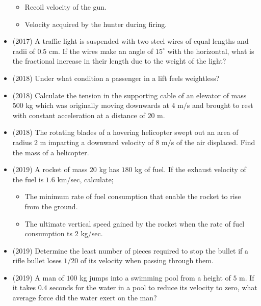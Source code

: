 \documentclass{article}
\begin{document}
\begin{itemize}
 \begin{itemize}
\item Recoil velocity of the gun. 
\item Velocity acquired by the hunter during firing.
\end{itemize}
\item (2017)  A traffic light is suspended with two steel wires of equal lengths and radii of $ 0.5$ cm. If the wires make an angle of $ 15^{\circ}$ with the horizontal, what is the fractional increase in their length due to the weight of the light? 
\item (2018)  Under what condition a passenger in a lift feels weightless? 
\item (2018)  Calculate the tension in the supporting cable of an elevator of mass $ 500$ kg which was originally moving downwards at $ 4$ m$/$s and brought to rest with constant acceleration at a distance of $ 20$ m. 
\item (2018)  The rotating blades of a hovering helicopter swept out an area of radius $ 2$ m imparting a downward velocity of $ 8$ m$/$s of the air displaced. Find the mass of a helicopter. 
\item (2019)  A rocket of mass $ 20$ kg has $ 180$ kg of fuel. If the exhaust velocity of the fuel is $ 1.6$ km/sec, calculate;
 \begin{itemize}
\item The minimum rate of fuel consumption that enable the rocket to rise from the ground. 
\item The ultimate vertical speed gained by the rocket when the rate of fuel consumption ts $ 2$ kg/sec. 
\end{itemize}
\item (2019)  Determine the least number of pieces required to stop the bullet if a rifle bullet loses $ 1/20$ of its velocity when passing through them.
\item (2019)  A man of $ 100$ kg jumps into a swimming pool from a height of $ 5$ m. If it takes $ 0.4$ seconds for the water in a pool to reduce its velocity to zero, what average force did  the water exert on the man? 
\end{itemize}
\end{document}
